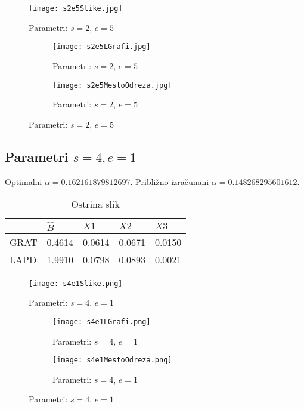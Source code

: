 \documentclass[a4paper,12pt]{article}
\begin{document}
\begin{figure}[h!]
	\texttt{[image: s2e5Slike.jpg]}
	\centering
	\caption{Parametri: $s = 2$, $e = 5$}
	\label{fig:s2e5Slike}
\end{figure}
\begin{figure}[h!]
	\begin{subfigure}{.5\textwidth}
		\texttt{[image: s2e5LGrafi.jpg]}
		\centering
		\caption{Parametri: $s = 2$, $e = 5$}
		\label{fig:s2e5LGrafi}
	\end{subfigure}
	\begin{subfigure}{.5\textwidth}
		\texttt{[image: s2e5MestoOdreza.jpg]}
		\centering
		\caption{Parametri: $s = 2$, $e = 5$}
		\label{fig:s2e5MestoOdreza}
	\end{subfigure}
\end{figure}



\newpage
\subsection{Parametri $s=4, e=1$}

Optimalni $\alpha = 0.162161879812697$.
Približno izračunani $\alpha = 0.148268295601612.$ 

\begin{table}[h!]
	\centering
\caption{Ostrina slik}
	\begin{tabular}{|l|l|l|l|l|}
		\hline
		& $\widehat{B}$ & $X1$   & $X2$   & $X3$   \\ \hline
		GRAT & 0.4614        & 0.0614 & 0.0671 & 0.0150 \\ \hline
		LAPD & 1.9910        & 0.0798 & 0.0893 & 0.0021 \\ \hline
	\end{tabular}
\end{table}


\begin{figure}[h!]
	\texttt{[image: s4e1Slike.png]}
	\centering
	\caption{Parametri: $s = 4$, $e = 1$}
	\label{fig:s4e1Slike}
\end{figure}
\begin{figure}[h!]
\begin{subfigure}{.5\textwidth}
	\texttt{[image: s4e1LGrafi.png]}
	\centering
	\caption{Parametri: $s = 4$, $e = 1$}
	\label{fig:s4e1LGrafi}
\end{subfigure}
\begin{subfigure}{.5\textwidth}
	\texttt{[image: s4e1MestoOdreza.png]}
	\centering
	\caption{Parametri: $s = 4$, $e = 1$}
	\label{fig:s4e1MestoOdreza}
\end{subfigure}
\end{figure}
\end{document}
